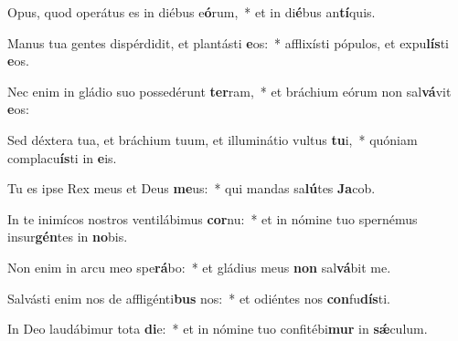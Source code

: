 \item Opus, quod operátus es in diébus e\textbf{ó}rum,~* et in di\textbf{é}bus an\textbf{tí}quis.
\item Manus tua gentes dispérdidit, et plantásti \textbf{e}os:~* afflixísti pópulos, et expu\textbf{lís}ti \textbf{e}os.
\item Nec enim in gládio suo possedérunt \textbf{ter}ram,~* et bráchium eórum non sal\textbf{vá}vit \textbf{e}os:
\item Sed déxtera tua, et bráchium tuum, et illuminátio vultus \textbf{tu}i,~* quóniam complacu\textbf{ís}ti in \textbf{e}is.
\item Tu es ipse Rex meus et Deus \textbf{me}us:~* qui mandas sa\textbf{lú}tes \textbf{Ja}cob.
\item In te inimícos nostros ventilábimus \textbf{cor}nu:~* et in nómine tuo spernémus insur\textbf{gén}tes in \textbf{no}bis.
\item Non enim in arcu meo spe\textbf{rá}bo:~* et gládius meus \textbf{non} sal\textbf{vá}bit me.
\item Salvásti enim nos de affligénti\textbf{bus} nos:~* et odiéntes nos \textbf{con}fu\textbf{dís}ti.
\item In Deo laudábimur tota \textbf{di}e:~* et in nómine tuo confitébi\textbf{mur} in \textbf{sǽ}culum.
